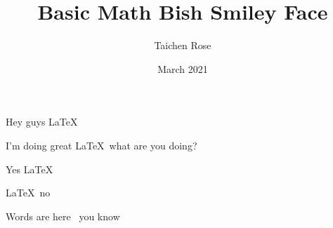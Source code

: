 \documentclass{article}
\title{Basic Math Bish Smiley Face}
\author{Taichen Rose}
\date{March 2021}
\begin{document}
Hey guys \LaTeX

I'm doing great \LaTeX\ what are you doing?

Yes \LaTeX\

\LaTeX\ no 

Words are here \but\ you know \begin{equation} \end{equation}\
\end{document}
